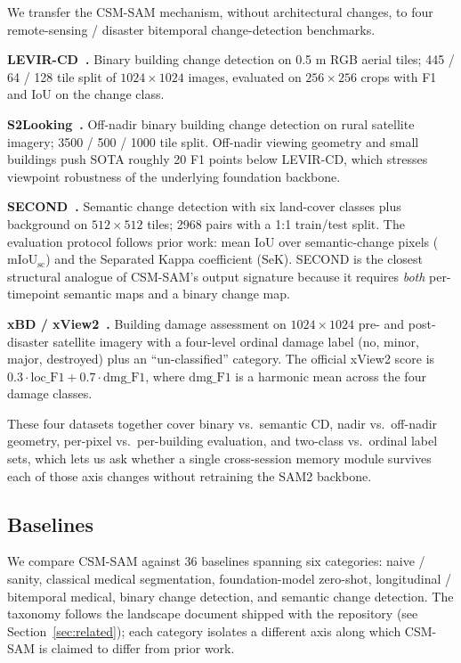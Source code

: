 We transfer the CSM-SAM mechanism, without architectural changes, to
four remote-sensing / disaster bitemporal change-detection benchmarks.

\textbf{LEVIR-CD~\cite{chen2020levircd}.} Binary building change
detection on 0.5 m RGB aerial tiles; 445 / 64 / 128 tile split of
$1024{\times}1024$ images, evaluated on $256{\times}256$ crops with F1
and IoU on the change class.

\textbf{S2Looking~\cite{shen2021s2looking}.} Off-nadir binary building
change detection on rural satellite imagery; 3500 / 500 / 1000 tile
split. Off-nadir viewing geometry and small buildings push SOTA
roughly 20 F1 points below LEVIR-CD, which stresses viewpoint
robustness of the underlying foundation backbone.

\textbf{SECOND~\cite{yang2021second}.} Semantic change detection with
six land-cover classes plus background on $512{\times}512$ tiles;
2968 pairs with a 1:1 train/test split. The evaluation protocol
follows prior work: mean IoU over semantic-change pixels
($\mathrm{mIoU}_{\mathrm{sc}}$) and the Separated Kappa coefficient
(SeK). SECOND is the closest structural analogue of CSM-SAM's output
signature because it requires \emph{both} per-timepoint semantic maps
and a binary change map.

\textbf{xBD / xView2~\cite{gupta2019xbd}.} Building damage assessment
on $1024{\times}1024$ pre- and post-disaster satellite imagery with a
four-level ordinal damage label (no, minor, major, destroyed) plus an
``un-classified'' category. The official xView2 score is
$0.3 \cdot \mathrm{loc\_F1} + 0.7 \cdot \mathrm{dmg\_F1}$, where
$\mathrm{dmg\_F1}$ is a harmonic mean across the four damage classes.

These four datasets together cover binary vs.\ semantic CD, nadir vs.\
off-nadir geometry, per-pixel vs.\ per-building evaluation, and
two-class vs.\ ordinal label sets, which lets us ask whether a single
cross-session memory module survives each of those axis changes without
retraining the SAM2 backbone.

\subsection{Baselines}
\label{sec:exp_baselines}

We compare CSM-SAM against 36 baselines spanning six categories:
naive / sanity, classical medical segmentation, foundation-model
zero-shot, longitudinal / bitemporal medical, binary change detection,
and semantic change detection. The taxonomy follows the landscape
document shipped with the repository (see Section~\ref{sec:related});
each category isolates a different axis along which CSM-SAM is
claimed to differ from prior work.

